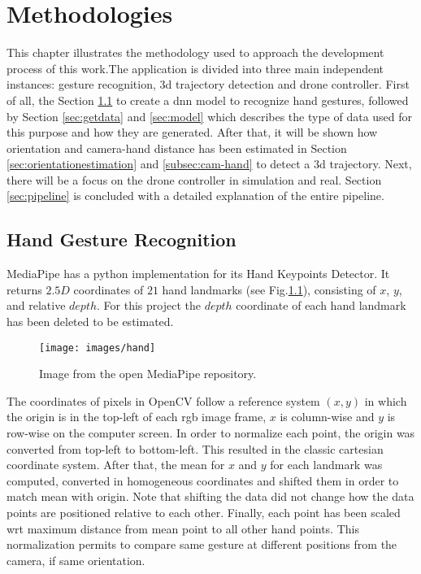 \chapter{Methodologies}
\label{chap:methods}

This chapter illustrates the methodology used to approach the development process of this work.The application is divided into three main independent instances: gesture recognition, \gls{3d} trajectory detection and drone controller. First of all, the Section \ref{sec:handgestrec} to create a \gls{dnn} model to recognize hand gestures, followed by Section \ref{sec:getdata} and \ref{sec:model} which describes the type of data used for this purpose and how they are generated. After that, it will be shown how orientation and camera-hand distance has been estimated in Section \ref{sec:orientationestimation} and \ref{subsec:cam-hand} to detect a \gls{3d} trajectory. Next, there will be a focus on the drone controller in simulation and real. Section \ref{sec:pipeline} is concluded with a detailed explanation of the entire pipeline.


\section{Hand Gesture Recognition}
\label{sec:handgestrec}
MediaPipe has a python implementation for its Hand Keypoints Detector. It returns $2.5D$ coordinates of $21$ hand landmarks (see Fig.\ref{fig:handland}), consisting of $x$, $y$, and relative $depth$. For this project the $depth$ coordinate of each hand landmark has been deleted to be estimated.


\begin{figure}[H]
	\centering
	\texttt{[image: images/hand]}
	\caption[Hand Landmarks.]{Image from the open MediaPipe repository.}
	\label{fig:handland}
\end{figure}

\noindent The coordinates of pixels in OpenCV follow a reference system $(x,y)$ in which the origin is in the top-left of each \gls{rgb} image frame, $x$ is column-wise and $y$ is row-wise on the computer screen. In order to normalize each point, the origin was converted from top-left to bottom-left. This resulted in the classic cartesian coordinate system. After that, the mean for $x$ and $y$ for each landmark was computed, converted in homogeneous coordinates and shifted them in order to match mean with origin. Note that shifting the data did not change how the data points are positioned relative to each other. Finally, each point has been scaled \gls{wrt} maximum distance from mean point to all other hand points. This normalization permits to compare same gesture at different positions from the camera, if same orientation. 

